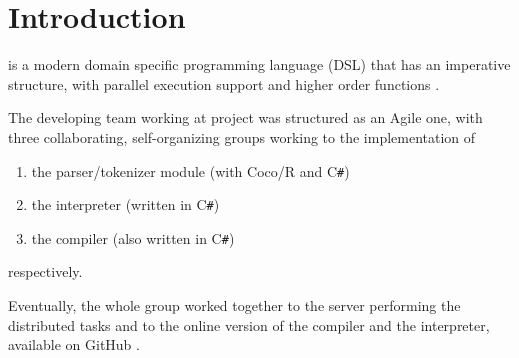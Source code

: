 \chapter{Introduction}

\fwap is a modern domain specific programming language (DSL) that has an imperative structure, with parallel execution support and higher order functions \cite{exercise}. 

The developing team working at project was structured as an Agile one, with three collaborating, self-organizing groups working to the implementation of
\begin{enumerate}
	\item the parser/tokenizer module (with Coco/R and C\texttt{\#})
	\item the interpreter (written in C\texttt{\#})
	\item the \fsharp compiler (also written in C\texttt{\#})
\end{enumerate}
respectively. 

Eventually, the whole group worked together to the server performing the distributed tasks and to the online version of the compiler and the interpreter, available on GitHub \cite{proj}.
